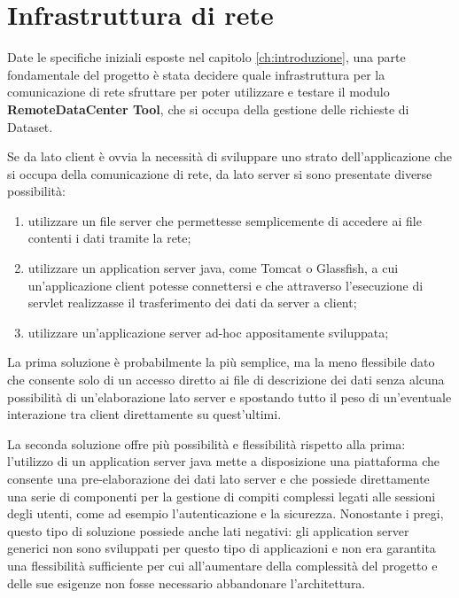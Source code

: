\section{Infrastruttura di rete} 
\label{sec:rete}
Date le specifiche iniziali esposte nel capitolo \ref{ch:introduzione}, una parte fondamentale del progetto \`e stata decidere quale infrastruttura per la comunicazione di rete sfruttare per poter utilizzare e testare il modulo \textbf{RemoteDataCenter Tool}, che si occupa della gestione delle richieste di Dataset.


Se da lato client \`e ovvia la necessit\`a di sviluppare uno strato dell'applicazione che si occupa della comunicazione di rete, da lato server si sono presentate diverse possibilit\`a: 

\begin{enumerate}
	\item  utilizzare un file server che permettesse semplicemente di accedere ai file contenti i dati tramite la rete;
	\item  utilizzare un application server java, come Tomcat o Glassfish, a cui un'applicazione client potesse connettersi e che attraverso l'esecuzione di servlet realizzasse il trasferimento dei dati da server a client;
	\item  utilizzare un'applicazione server ad-hoc appositamente sviluppata;
\end{enumerate}

La prima soluzione \`e probabilmente la pi\`u semplice, ma la meno flessibile dato che consente solo di un accesso diretto ai file di descrizione dei dati senza alcuna possibilit\`a di un'elaborazione lato server e spostando tutto il peso di un'eventuale interazione tra client direttamente su quest'ultimi.

La seconda soluzione offre pi\`u possibilit\`a e flessibilit\`a rispetto alla prima: l'utilizzo di un application server java mette a disposizione una piattaforma che consente una pre-elaborazione dei dati lato server e che possiede direttamente una serie di componenti per la gestione di compiti complessi legati alle sessioni degli utenti, come ad esempio l'autenticazione e la sicurezza. Nonostante i pregi, questo tipo di soluzione possiede anche lati negativi: gli application server generici non sono sviluppati per questo tipo di applicazioni e non era garantita una flessibilit\`a sufficiente per cui all'aumentare della complessit\`a del progetto e delle sue esigenze non fosse necessario abbandonare l'architettura. 

